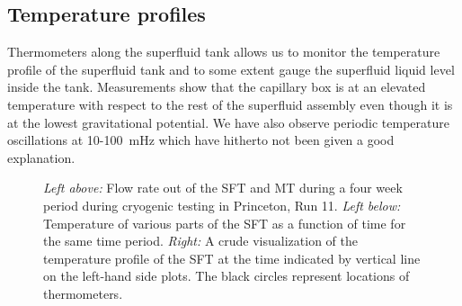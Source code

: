 \documentclass[
12pt, %
letterpaper, %
oneside, %
headinclude, footinclude, %
BCOR5mm, %
]{scrartcl}
\begin{document}
\subsection{Temperature profiles}


Thermometers along the superfluid tank allows us to monitor the temperature profile of the superfluid tank and to some extent gauge the superfluid liquid level inside the tank. Measurements show that the capillary box is at an elevated temperature with respect to the rest of the superfluid assembly even though it is at the lowest gravitational potential. We have also observe periodic temperature oscillations at 10-100~mHz which have hitherto not been given a good explanation.

\begin{figure}[t]
\begin{center}
\end{center}
\caption[Cryogenic data from the MT and SFT]{\textit{Left above:} Flow rate out of the SFT and MT during a four week period during cryogenic testing in Princeton, Run 11. \textit{Left below:} Temperature of various parts of the SFT as a function of time for the same time period. \textit{Right:} A crude visualization of the temperature profile of the SFT at the time indicated by vertical line on the left-hand side plots. The black circles represent locations of thermometers.}
\label{fig:sft_hist}
\end{figure} 
\end{document}
